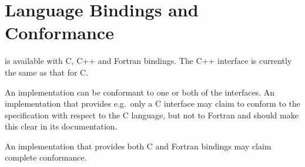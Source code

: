 \section{Language Bindings and Conformance}

\openshmem is available with C, C++ and Fortran bindings.  The C++
interface is currently the same as that for C.

An \openshmem implementation can be conformant to one or both of the
interfaces.  An implementation that provides e.g.\ only a C interface
may claim to conform to the \openshmem specification with respect to
the C language, but not to Fortran and should make this clear in its
documentation.

An implementation that provides both C and Fortran bindings may claim
complete conformance.
